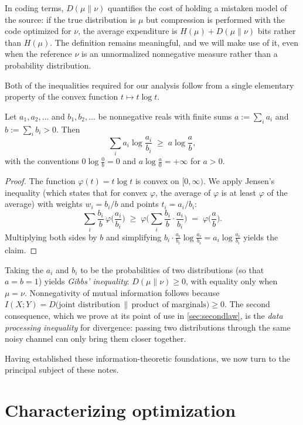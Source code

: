\documentclass[11pt]{article}
\begin{document}
In coding terms, $D(\mu \| \nu)$ quantifies the cost of holding a mistaken model of the source: if the true distribution is $\mu$ but compression is performed with the code optimized for $\nu$, the average expenditure is $H(\mu) + D(\mu\|\nu)$ bits rather than $H(\mu)$. The definition remains meaningful, and we will make use of it, even when the reference $\nu$ is an unnormalized nonnegative measure rather than a probability distribution.

Both of the inequalities required for our analysis follow from a single elementary property of the convex function $t \mapsto t \log t$.

\begin{lemma}
\label{lem:logsum}
Let $a_1, a_2, \dots$ and $b_1, b_2, \dots$ be nonnegative reals with finite sums $a := \sum_i a_i$ and $b := \sum_i b_i > 0$. Then
\[
\sum_i a_i \log \frac{a_i}{b_i} \;\ge\; a \log \frac{a}{b},
\]
with the conventions $0 \log \frac{0}{b} = 0$ and $a \log \frac{a}{0} = +\infty$ for $a > 0$.
\end{lemma}

\begin{proof}
The function $\varphi(t) = t \log t$ is convex on $[0, \infty)$. We apply Jensen's inequality (which states that for convex $\varphi$, the average of $\varphi$ is at least $\varphi$ of the average) with weights $w_i = b_i / b$ and points $t_i = a_i / b_i$:
\[
\sum_i \frac{b_i}{b}\, \varphi\!\Big(\frac{a_i}{b_i}\Big) \;\ge\; \varphi\!\Big(\sum_i \frac{b_i}{b} \cdot \frac{a_i}{b_i}\Big) \;=\; \varphi\!\Big(\frac{a}{b}\Big).
\]
Multiplying both sides by $b$ and simplifying $b_i \cdot \frac{a_i}{b_i}\log\frac{a_i}{b_i} = a_i \log \frac{a_i}{b_i}$ yields the claim.
\end{proof}

Taking the $a_i$ and $b_i$ to be the probabilities of two distributions (so that $a = b = 1$) yields \emph{Gibbs' inequality}: $D(\mu \| \nu) \ge 0$, with equality only when $\mu = \nu$. Nonnegativity of mutual information follows because $I(X;Y) = D\big(\text{joint distribution} \,\|\, \text{product of marginals}\big) \ge 0$. The second consequence, which we prove at its point of use in \cref{sec:secondlaw}, is the \emph{data processing inequality} for divergence: passing two distributions through the same noisy channel can only bring them closer together.

Having established these information-theoretic foundations, we now turn to the principal subject of these notes.
\section{Characterizing optimization}
\label{sec:optsys}
\end{document}

